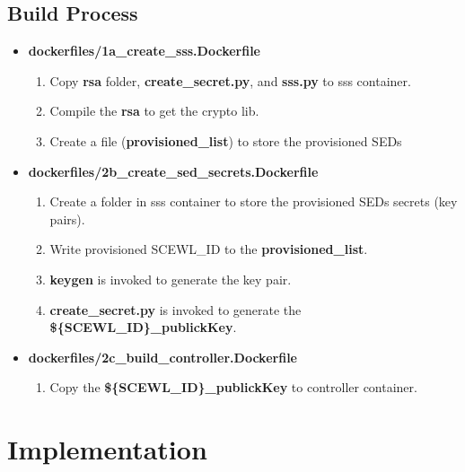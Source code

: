 \documentclass[11pt,oneside,onecolumn,letterpaper]{article}
\begin{document}
\subsection{Build Process}

  \begin{itemize}
    \item \textbf{dockerfiles/1a\_create\_sss.Dockerfile}
    \begin{enumerate}
      \item Copy \textbf{rsa} folder, \textbf{create\_secret.py}, and \textbf{sss.py} to sss container.
      \item Compile the \textbf{rsa} to get the crypto lib.
      \item Create a file (\textbf{provisioned\_list}) to store the provisioned SEDs
    \end{enumerate}
    \item \textbf{dockerfiles/2b\_create\_sed\_secrets.Dockerfile}
    \begin{enumerate}
      \item Create a folder in sss container to store the provisioned SEDs secrets (key pairs).
      \item Write provisioned SCEWL\_ID to the \textbf{provisioned\_list}.
      \item \textbf{keygen} is invoked to generate the key pair.
      \item \textbf{create\_secret.py} is invoked to generate the \textbf{\$\{SCEWL\_ID\}\_publickKey}.
    \end{enumerate}
    \item \textbf{dockerfiles/2c\_build\_controller.Dockerfile}
    \begin{enumerate}
      \item Copy the \textbf{\$\{SCEWL\_ID\}\_publickKey} to controller container.
    \end{enumerate}
  \end{itemize}

\section{Implementation}
\end{document}
